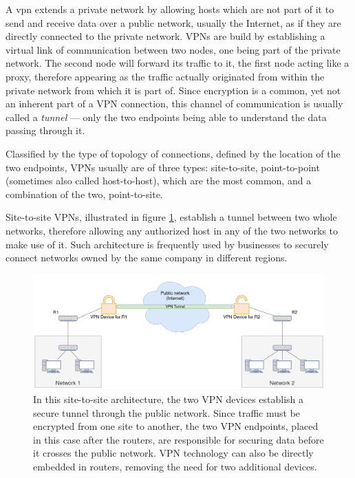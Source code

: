 \documentclass[a4paper,12pt]{report}
\begin{document}
		A \acrfull{vpn} extends a private network by allowing hosts which are not part of it to send and receive data over a public network, usually the Internet, as if they are directly connected to the private network. VPNs are build by establishing a virtual link of communication between two nodes, one being part of the private network. The second node will forward its traffic to it, the first node acting like a proxy, therefore appearing as the traffic actually originated from within the private network from which it is part of. Since encryption is a common, yet not an inherent part of a VPN connection, this channel of communication is usually called a \textit{tunnel} --- only the two endpoints being able to understand the data passing through it. 
		
		Classified by the type of topology of connections, defined by the location of the two endpoints, VPNs usually are of three types: site-to-site, point-to-point (sometimes also called host-to-host), which are the most common, and a combination of the two, point-to-site.
		
		Site-to-site VPNs, illustrated in figure \ref{fig:site-to-site_VPN}, establish a tunnel between two whole networks, therefore allowing any authorized host in any of the two networks to make use of it. Such architecture is frequently used by businesses to securely connect networks owned by the same company in different regions.
		\begin{figure}[h]
			\includegraphics[width=\textwidth]{site-to-site_VPN}
			\centering
			\caption{In this site-to-site architecture, the two VPN devices establish a secure tunnel through the public network. Since traffic must be encrypted from one site to another, the two VPN endpoints, placed in this case after the routers, are responsible for securing data before it crosses the public network. VPN technology can also be directly embedded in routers, removing the need for two additional devices.}
			\label{fig:site-to-site_VPN}
		\end{figure}
		
\end{document}
